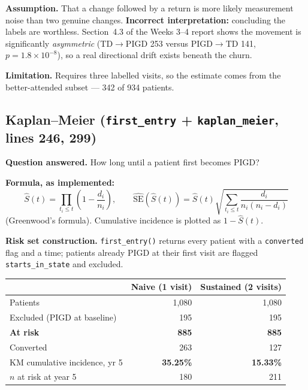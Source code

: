 \documentclass[11pt,a4paper]{article}
\newcommand{\code}[1]{\texttt{\small #1}}
\newcommand{\arr}{$\rightarrow$}
\begin{document}
\textbf{Assumption.} That a change followed by a return is more likely
measurement noise than two genuine changes. \textbf{Incorrect
interpretation:} concluding the labels are worthless. Section~4.3 of the
Weeks 3--4 report shows the movement is significantly \emph{asymmetric}
(TD\arr PIGD 253 versus PIGD\arr TD 141, $p = 1.8\times 10^{-8}$), so a real
directional drift exists beneath the churn.

\textbf{Limitation.} Requires three labelled visits, so the estimate comes
from the better-attended subset --- 342 of 934 patients.

\subsection{Kaplan--Meier \quad (\code{first\_entry} + \code{kaplan\_meier}, lines 246, 299)}

\textbf{Question answered.} How long until a patient first becomes PIGD?

\textbf{Formula, as implemented:}
\[
  \hat S(t) = \prod_{t_i \leq t}\left(1 - \frac{d_i}{n_i}\right),
  \qquad
  \widehat{\mathrm{SE}}(\hat S(t)) = \hat S(t)\sqrt{\sum_{t_i \leq t}\frac{d_i}{n_i(n_i - d_i)}}
\]
(Greenwood's formula). Cumulative incidence is plotted as $1 - \hat S(t)$.

\textbf{Risk set construction.} \code{first\_entry()} returns every patient
with a \code{converted} flag and a time; patients already PIGD at their first
visit are flagged \code{starts\_in\_state} and excluded.

\begin{table}[h]
\centering
\begin{tabular}{@{}lrr@{}}
\toprule
& \textbf{Naive (1 visit)} & \textbf{Sustained (2 visits)} \\
\midrule
Patients                       & 1{,}080 & 1{,}080 \\
Excluded (PIGD at baseline)    & \phantom{0,}195 & \phantom{0,}195 \\
\textbf{At risk}               & \phantom{0,}\textbf{885} & \phantom{0,}\textbf{885} \\
Converted                      & \phantom{0,}263 & \phantom{0,}127 \\
KM cumulative incidence, yr 5  & \textbf{35.25\%} & \textbf{15.33\%} \\
$n$ at risk at year 5          & \phantom{0,}180 & \phantom{0,}211 \\
\bottomrule
\end{tabular}
\end{table}
\end{document}
